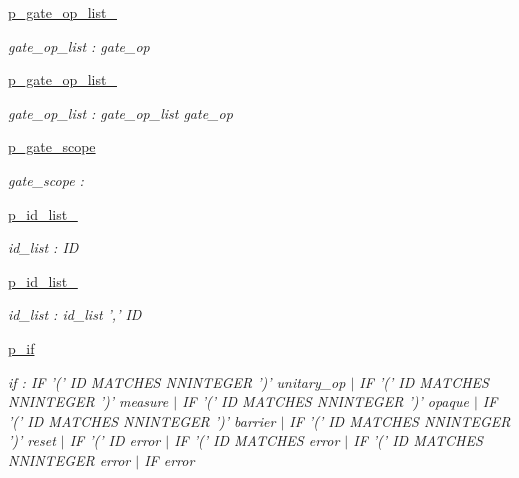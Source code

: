 \begin{DoxyCompactItemize}
\hyperlink{namespaceqat_1_1interop_1_1qasm__parser_1_1OqasmParser_1_1p__gate__op__list__0}{p\-\_\-gate\-\_\-op\-\_\-list\-\_}
\begin{DoxyCompactList}\small\item\em gate\-\_\-op\-\_\-list \-: gate\-\_\-op \end{DoxyCompactList}\item 
\hyperlink{namespaceqat_1_1interop_1_1qasm__parser_1_1OqasmParser_1_1p__gate__op__list__1}{p\-\_\-gate\-\_\-op\-\_\-list\-\_}
\begin{DoxyCompactList}\small\item\em gate\-\_\-op\-\_\-list \-: gate\-\_\-op\-\_\-list gate\-\_\-op \end{DoxyCompactList}\item 
\hyperlink{namespaceqat_1_1interop_1_1qasm__parser_1_1OqasmParser_1_1p__gate__scope}{p\-\_\-gate\-\_\-scope}
\begin{DoxyCompactList}\small\item\em gate\-\_\-scope \-: \end{DoxyCompactList}\item 
\hyperlink{namespaceqat_1_1interop_1_1qasm__parser_1_1OqasmParser_1_1p__id__list__0}{p\-\_\-id\-\_\-list\-\_}
\begin{DoxyCompactList}\small\item\em id\-\_\-list \-: I\-D \end{DoxyCompactList}\item 
\hyperlink{namespaceqat_1_1interop_1_1qasm__parser_1_1OqasmParser_1_1p__id__list__1}{p\-\_\-id\-\_\-list\-\_}
\begin{DoxyCompactList}\small\item\em id\-\_\-list \-: id\-\_\-list ',' I\-D \end{DoxyCompactList}\item 
\hyperlink{namespaceqat_1_1interop_1_1qasm__parser_1_1OqasmParser_1_1p__if}{p\-\_\-if}
\begin{DoxyCompactList}\small\item\em if \-: I\-F '(' I\-D M\-A\-T\-C\-H\-E\-S N\-N\-I\-N\-T\-E\-G\-E\-R ')' unitary\-\_\-op $|$ I\-F '(' I\-D M\-A\-T\-C\-H\-E\-S N\-N\-I\-N\-T\-E\-G\-E\-R ')' measure $|$ I\-F '(' I\-D M\-A\-T\-C\-H\-E\-S N\-N\-I\-N\-T\-E\-G\-E\-R ')' opaque $|$ I\-F '(' I\-D M\-A\-T\-C\-H\-E\-S N\-N\-I\-N\-T\-E\-G\-E\-R ')' barrier $|$ I\-F '(' I\-D M\-A\-T\-C\-H\-E\-S N\-N\-I\-N\-T\-E\-G\-E\-R ')' reset $|$ I\-F '(' I\-D error $|$ I\-F '(' I\-D M\-A\-T\-C\-H\-E\-S error $|$ I\-F '(' I\-D M\-A\-T\-C\-H\-E\-S N\-N\-I\-N\-T\-E\-G\-E\-R error $|$ I\-F error \end{DoxyCompactList}\item 

\end{DoxyCompactItemize}
